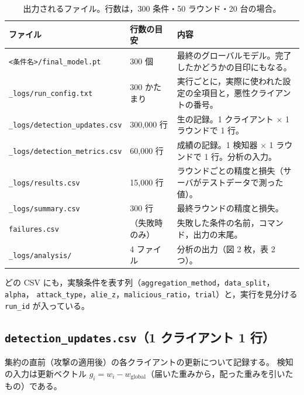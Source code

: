 \documentclass[a4j, dvipdfmx]{jsarticle}  %
\begin{document}
\begin{table}[H]
\centering
\caption{出力されるファイル。行数は，300 条件・50 ラウンド・20 台の場合。}
\small
\begin{tabular}{@{}P{5.0cm} P{2.4cm} P{7.9cm}@{}}
\toprule
ファイル & 行数の目安 & 内容 \\
\midrule
\texttt{<条件名>/final\_model.pt} & 300 個 & 最終のグローバルモデル。完了したかどうかの目印にもなる。 \\
\texttt{\_logs/run\_config.txt} & 300 かたまり & 実行ごとに，実際に使われた設定の全項目と，悪性クライアントの番号。 \\
\texttt{\_logs/detection\_updates.csv} & 300{,}000 行 & 生の記録。1 クライアント $\times$ 1 ラウンドで 1 行。 \\
\texttt{\_logs/detection\_metrics.csv} & 60{,}000 行 & 成績の記録。1 検知器 $\times$ 1 ラウンドで 1 行。分析の入力。 \\
\texttt{\_logs/results.csv} & 15{,}000 行 & ラウンドごとの精度と損失（サーバがテストデータで測った値）。 \\
\texttt{\_logs/summary.csv} & 300 行 & 最終ラウンドの精度と損失。 \\
\texttt{failures.csv} & （失敗時のみ） & 失敗した条件の名前，コマンド，出力の末尾。 \\
\texttt{\_logs/analysis/} & 4 ファイル & 分析の出力（図 2 枚，表 2 つ）。 \\
\bottomrule
\end{tabular}
\end{table}

どの CSV にも，実験条件を表す列（\texttt{aggregation\_method}，\texttt{data\_split}，\texttt{alpha}，
\texttt{attack\_type}，\texttt{alie\_z}，\texttt{malicious\_ratio}，\texttt{trial}）と，実行を見分ける \texttt{run\_id} が入っている。

\subsection{\texttt{detection\_updates.csv}（1 クライアント 1 行）}

集約の直前（攻撃の適用後）の各クライアントの更新について記録する。
検知の入力は更新ベクトル $g_i = w_i - w_{\text{global}}$（届いた重みから，配った重みを引いたもの）である。
\end{document}

